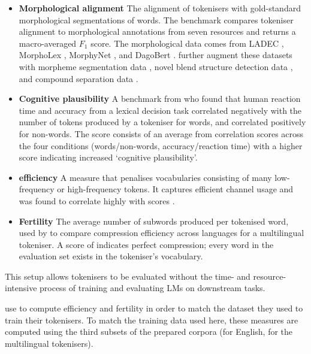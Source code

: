\begin{itemize}[leftmargin=*]
    \item \textbf{Morphological alignment} The alignment of tokenisers with gold-standard morphological segmentations of words. The benchmark compares tokeniser alignment to morphological annotations from seven resources and returns a macro-averaged $F_1$ score. The morphological data comes from LADEC \citep{gagne2019ladec}, MorphoLex \citep{sanchez2018morpholex}, MorphyNet \citep{batsuren-etal-2021-morphynet}, and DagoBert \citep{hofmann-etal-2020-dagobert}. \citet{uzan-etal-2024-greed} further augment these datasets with morpheme segmentation data \citep{batsuren-etal-2022-unimorph}, novel blend structure detection data \citep{pinter-etal-2021-will}, and compound separation data \citep{minixhofer-etal-2023-compoundpiece}.
    \item \textbf{Cognitive plausibility} A benchmark from \citet{beinborn-pinter-2023-analyzing} who found that human reaction time and accuracy from a lexical decision task correlated negatively with the number of tokens produced by a tokeniser for words, and correlated positively for non-words. The score consists of an average from correlation scores across the four conditions (words/non-words, accuracy/reaction time) with a higher score indicating increased `cognitive plausibility'.
    \item \textbf{\renyi efficiency} A measure that penalises vocabularies consisting of many low-frequency or high-frequency tokens. It captures efficient channel usage and was found to correlate highly with  scores \citep{zouhar-etal-2023-tokenization}.
    \item \textbf{Fertility} The average number of subwords produced per tokenised word, used by \citet{acs2019exploring} to compare compression efficiency across languages for a multilingual tokeniser. A score of  indicates perfect compression; every word in the evaluation set exists in the tokeniser's vocabulary.
\end{itemize}

This setup allows tokenisers to be evaluated without the time- and resource-intensive process of training and evaluating LMs on downstream tasks. 

\citet{uzan-etal-2024-greed} use \minipile \citep{kaddour2023minipile} to compute \renyi efficiency and fertility in order to match the dataset they used to train their tokenisers. To match the training data used here, these measures are computed using the third subsets of the prepared corpora (\fineweb for English, \commoncorpus for the multilingual tokenisers).

